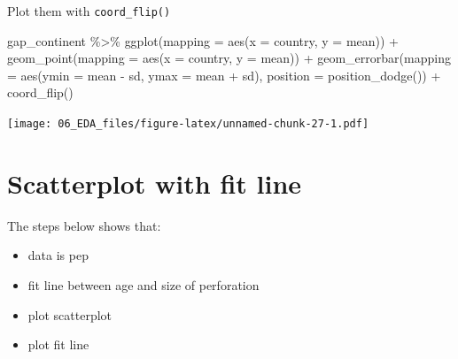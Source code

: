 \documentclass[
  10pt,
]{krantz}
\newenvironment{Shaded}{\begin{snugshade}}{\end{snugshade}}
\newcommand{\AttributeTok}[1]{\textcolor[rgb]{0.77,0.63,0.00}{#1}}
\newcommand{\FunctionTok}[1]{\textcolor[rgb]{0.00,0.00,0.00}{#1}}
\newcommand{\NormalTok}[1]{#1}
\newcommand{\SpecialCharTok}[1]{\textcolor[rgb]{0.00,0.00,0.00}{#1}}
\providecommand{\tightlist}{%
  \setlength{\itemsep}{0pt}\setlength{\parskip}{0pt}}
\begin{document}
Plot them with \texttt{coord\_flip()}

\begin{Shaded}
\begin{Highlighting}[]
\NormalTok{gap\_continent }\SpecialCharTok{\%\textgreater{}\%}   
  \FunctionTok{ggplot}\NormalTok{(}\AttributeTok{mapping =} \FunctionTok{aes}\NormalTok{(}\AttributeTok{x =}\NormalTok{ country, }\AttributeTok{y =}\NormalTok{ mean)) }\SpecialCharTok{+} 
  \FunctionTok{geom\_point}\NormalTok{(}\AttributeTok{mapping =} \FunctionTok{aes}\NormalTok{(}\AttributeTok{x =}\NormalTok{ country, }\AttributeTok{y =}\NormalTok{ mean)) }\SpecialCharTok{+}
  \FunctionTok{geom\_errorbar}\NormalTok{(}\AttributeTok{mapping =} \FunctionTok{aes}\NormalTok{(}\AttributeTok{ymin =}\NormalTok{ mean }\SpecialCharTok{{-}}\NormalTok{ sd, }\AttributeTok{ymax =}\NormalTok{ mean }\SpecialCharTok{+}\NormalTok{ sd),}
                \AttributeTok{position =} \FunctionTok{position\_dodge}\NormalTok{()) }\SpecialCharTok{+}
  \FunctionTok{coord\_flip}\NormalTok{()}
\end{Highlighting}
\end{Shaded}

\texttt{[image: 06\_EDA\_files/figure-latex/unnamed-chunk-27-1.pdf]}

\hypertarget{scatterplot-with-fit-line}{%
\section{\texorpdfstring{Scatterplot with fit line}{Scatterplot with fit line}}\label{scatterplot-with-fit-line}}

The steps below shows that:

\begin{itemize}
\tightlist
\item
  data is pep
\item
  fit line between age and size of perforation
\item
  plot scatterplot
\item
  plot fit line
\end{itemize}
\end{document}
